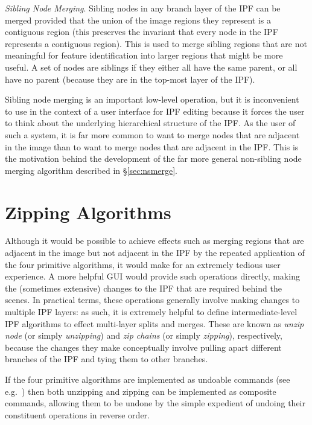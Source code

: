 \documentclass[10pt,twocolumn,twoside]{IEEEtran}
\begin{document}
\emph{Sibling Node Merging}. Sibling nodes in any branch layer of the IPF can be merged provided that the union of the image regions they represent is a contiguous region (this preserves the invariant that every node in the IPF represents a contiguous region). This is used to merge sibling regions that are not meaningful for feature identification into larger regions that might be more useful. A set of nodes are siblings if they either all have the same parent, or all have no parent (because they are in the top-most layer of the IPF).

Sibling node merging is an important low-level operation, but it is inconvenient to use in the context of a user interface for IPF editing because it forces the user to think about the underlying hierarchical structure of the IPF. As the user of such a system, it is far more common to want to merge nodes that are adjacent in the image than to want to merge nodes that are adjacent in the IPF. This is the motivation behind the development of the far more general non-sibling node merging algorithm described in \S\ref{sec:nsmerge}.

\section{Zipping Algorithms}
\label{sec:zipping}

Although it would be possible to achieve effects such as merging regions that are adjacent in the image but not adjacent in the IPF by the repeated application of the four primitive algorithms, it would make for an extremely tedious user experience. A more helpful GUI would provide such operations directly, making the (sometimes extensive) changes to the IPF that are required behind the scenes. In practical terms, these operations generally involve making changes to multiple IPF layers: as such, it is extremely helpful to define intermediate-level IPF algorithms to effect multi-layer splits and merges. These are known as \emph{unzip node} (or simply \emph{unzipping}) and \emph{zip chains} (or simply \emph{zipping}), respectively, because the changes they make conceptually involve pulling apart different branches of the IPF and tying them to other branches.

If the four primitive algorithms are implemented as undoable commands (see e.g.~\cite{gamma95,golodetz06}) then both unzipping and zipping can be implemented as composite commands, allowing them to be undone by the simple expedient of undoing their constituent operations in reverse order.
\end{document}
